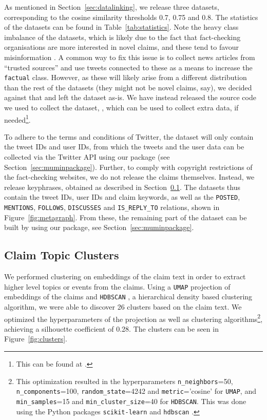 \documentclass[sigconf,natbib=true,anonymous=false,nonacm]{acmart}
\begin{document}
As mentioned in Section~\ref{sec:datalinking}, we release three datasets,
corresponding to the cosine similarity thresholds 0.7, 0.75 and 0.8. The
statistics of the datasets can be found in Table~\ref{tab:statistics}. Note the
heavy class imbalance of the datasets, which is likely due to the fact that
fact-checking organisations are more interested in novel claims, and these tend
to favour misinformation \citep{vosoughi2018spread}. A common way to fix this
issue \citep{li2020mmcovid, cui2020coaid} is to collect news articles from
``trusted sources'' and use tweets connected to these as a means to increase
the \texttt{factual} class. However, as these will likely arise from a
different distribution than the rest of the datasets (they might not be novel
claims, say), we decided against that and left the dataset as-is. We have
instead released the source code we used to collect the dataset, \trawlname,
which can be used to collect extra data, if needed\footnote{This can be found
at \dataseturl.}.

To adhere to the terms and conditions of Twitter, the dataset will only contain
the tweet IDs and user IDs, from which the tweets and the user data can be
collected via the Twitter API using our \pkgname package (see
Section~\ref{sec:muminpackage}). Further, to comply with copyright restrictions
of the fact-checking websites, we do not release the claims themselves.
Instead, we release keyphrases, obtained as described in
Section~\ref{sec:clusteranalysis}. The datasets thus contain the tweet IDs,
user IDs and claim keywords, as well as the \texttt{POSTED}, \texttt{MENTIONS},
\texttt{FOLLOWS}, \texttt{DISCUSSES} and \texttt{IS\_REPLY\_TO} relations,
shown in Figure~\ref{fig:metagraph}. From these, the remaining part of the
dataset can be built by using our \pkgname package, see
Section~\ref{sec:muminpackage}.

\subsection{Claim Topic Clusters}
\label{sec:clusteranalysis}
We performed clustering on embeddings of the claim text in order to extract
higher level topics or events from the claims. Using a \texttt{UMAP}
\citep{mcinnes2018umap} projection of embeddings of the claims and
\texttt{HDBSCAN} \citep{mcinnes2017accelerated}, a hierarchical density based
clustering algorithm, we were able to discover 26 clusters based on the claim
text. We optimized the hyperparameters of the projection as well as clustering
algorithms\footnote{This optimization resulted in the hyperparameters
\texttt{n\_neighbors}=50, \texttt{n\_components}=100,
\texttt{random\_state}=4242 and \texttt{metric}='cosine' for \texttt{UMAP},
and \texttt{min\_samples}=15 and \texttt{min\_cluster\_size}=40 for
\texttt{HDBSCAN}. This was done using the Python packages
\texttt{scikit-learn} \cite{pedregosa2011scikit} and \texttt{hdbscan}
\cite{mcinnes2017hdbscan}.}, achieving a silhouette coefficient of 0.28. The
clusters can be seen in Figure~\ref{fig:clusters}.
\end{document}
